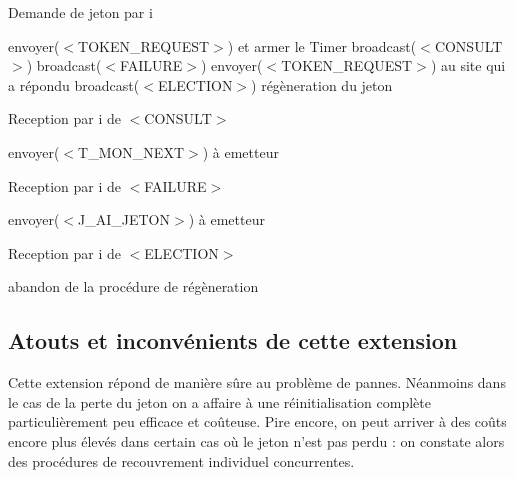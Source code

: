 \documentclass[a4paper,12pt]{report}
\newcommand{\next}{\textit{next} }
\begin{document}
\begin{algorithm}[t]
\caption{Demande de jeton par i}
\label{algo_naimi_trehel_ext_TK}
\begin{algorithmic}[1]

\STATE envoyer($<$TOKEN\_REQUEST$>$) et armer le Timer
  \STATE broadcast($<$CONSULT$>$)
    \STATE broadcast($<$FAILURE$>$)
      \STATE envoyer($<$TOKEN\_REQUEST$>$) au site qui a répondu
    \ELSE
      \STATE broadcast($<$ELECTION$>$)
	\STATE régèneration du jeton
      \ENDIF
    \ENDIF
  \ENDIF
\ENDIF
\end{algorithmic}
\end{algorithm}

\begin{algorithm}[t]
\caption{Reception par i de $<$CONSULT$>$}
\label{algo_naimi_trehel_ext_Consult}
\begin{algorithmic}[1]
\IF{\next$_{i}$ $=$ i}
\STATE envoyer($<$T\_MON\_NEXT$>$) à emetteur 
\ENDIF
\end{algorithmic}
\end{algorithm}

\begin{algorithm}[t]
\caption{Reception par i de $<$FAILURE$>$}
\label{algo_naimi_trehel_ext_Failure}
\begin{algorithmic}[1]
\STATE envoyer($<$J\_AI\_JETON$>$) à emetteur
\ENDIF
\end{algorithmic}
\end{algorithm}

\begin{algorithm}[t]
\caption{Reception par i de $<$ELECTION$>$}
\label{algo_naimi_trehel_ext_Election}
\begin{algorithmic}[1]
  \STATE abandon de la procédure de régèneration
  \ENDIF
\ENDIF
\end{algorithmic}
\end{algorithm}

\subsection*{Atouts et inconvénients de cette extension}
Cette extension répond de manière sûre au problème de pannes. Néanmoins dans le cas de la perte du jeton on a affaire à une réinitialisation complète particulièrement peu efficace et coûteuse. Pire encore, on peut arriver à des coûts encore plus élevés dans certain cas où le jeton n'est pas perdu : on constate alors des procédures de recouvrement individuel concurrentes.
\end{document}

